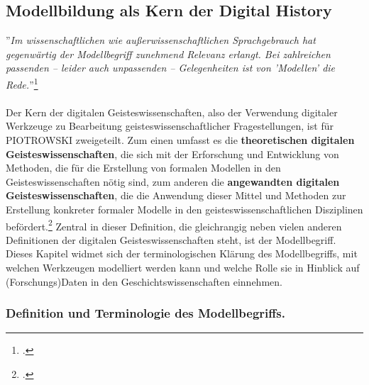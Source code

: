 \documentclass[12pt,a4paper]{article}
\begin{document}

\newpage
\subsection{Modellbildung als Kern der Digital History}
\label{Modellbildung}
''\textit{Im wissenschaftlichen wie außerwissenschaftlichen Sprachgebrauch hat gegenwärtig der Modellbegriff zunehmend Relevanz erlangt. Bei zahlreichen passenden -- leider auch unpassenden -- Gelegenheiten ist von 'Modellen' die Rede.}''\footcite[][S.1]{stachowiak1973allgemeine}
\\
\\
Der Kern der digitalen Geisteswissenschaften, also der Verwendung digitaler Werkzeuge zu Bearbeitung geisteswissenschaftlicher Fragestellungen, ist für PIOTROWSKI zweigeteilt. Zum einen umfasst es die \textbf{theoretischen digitalen Geisteswissenschaften}, die sich mit der Erforschung und Entwicklung von Methoden, die für die Erstellung von formalen Modellen in den Geisteswissenschaften nötig sind, zum anderen die \textbf{angewandten digitalen Geisteswissenschaften}, die die Anwendung dieser Mittel und Methoden zur Erstellung konkreter formaler Modelle in den geisteswissenschaftlichen Disziplinen befördert.\footcite{piotrowski2016digital} Zentral in dieser Definition, die gleichrangig neben vielen anderen Definitionen der digitalen Geisteswissenschaften steht, ist der Modellbegriff. 
\\
Dieses Kapitel widmet sich der terminologischen Klärung des Modellbegriffs, mit welchen Werkzeugen modelliert werden kann und welche Rolle sie in Hinblick auf (Forschungs)Daten in den Geschichtswissenschaften einnehmen.

\subsubsection{Definition und Terminologie des Modellbegriffs.}
\label{Modell_def}
\end{document}
